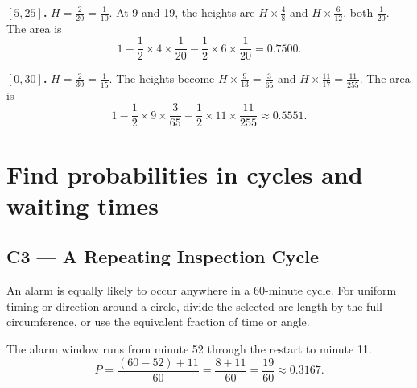\textbf{\([5,25]\).} \(H=\frac{2}{20}=\frac{1}{10}\). At 9 and 19, the heights are \(H\times\frac{4}{8}\) and \(H\times\frac{6}{12}\), both \(\frac{1}{20}\). The area is
\[
  1-\frac12\times4\times\frac1{20}-\frac12\times6\times\frac1{20}
  =\mathbf{0.7500}.
\]

\textbf{\([0,30]\).} \(H=\frac{2}{30}=\frac{1}{15}\). The heights become \(H\times\frac{9}{13}=\frac{3}{65}\) and \(H\times\frac{11}{17}=\frac{11}{255}\). The area is
\[
  1-\frac12\times9\times\frac3{65}-\frac12\times11\times\frac{11}{255}
  \approx\mathbf{0.5551}.
\]

\clearpage
\section{Find probabilities in cycles and waiting times}

\subsection*{C3 --- A Repeating Inspection Cycle}

An alarm is equally likely to occur anywhere in a 60-minute cycle. For uniform timing or direction around a circle, divide the selected arc length by the full circumference, or use the equivalent fraction of time or angle.

\begin{center}
  \begin{minipage}{0.44\linewidth}
    \centering
  \end{minipage}%
  \begin{minipage}{0.52\linewidth}
    The alarm window runs from minute 52 through the restart to minute 11.
    \[
      P=\frac{(60-52)+11}{60}=\frac{8+11}{60}=\frac{19}{60}\approx0.3167.
    \]
  \end{minipage}
\end{center}

